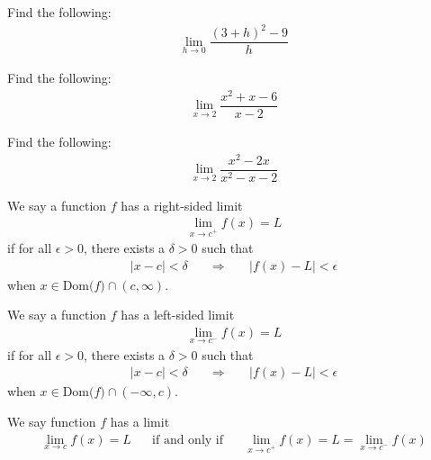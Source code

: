 \begin{exercise} Find the following:
\begin{align*}
    \lim_{h \longrightarrow 0} \dfrac{(3+h)^{2} - 9}{h}
\end{align*}
\end{exercise}

\begin{exercise}
Find the following:
\begin{align*}
    \lim_{x \longrightarrow 2} \dfrac{x^{2}+x-6}{x-2}
\end{align*}
\end{exercise}

\begin{exercise}
Find the following:
\begin{align*}
    \lim_{x \longrightarrow 2} \dfrac{x^{2}-2x}{x^{2}-x-2}
\end{align*}
\end{exercise}

\begin{definition}
We say a function $f$ has a right-sided limit
\begin{align*}
    \lim_{x \longrightarrow c^{+}} f(x) = L
\end{align*}
if for all $\epsilon > 0$, there exists a $\delta > 0$ such that
\begin{align*}
    \lvert x - c \rvert < \delta \hspace{20pt} \Longrightarrow \hspace{20pt} \lvert f(x) - L \rvert < \epsilon
\end{align*}
when $x \in \text{Dom($f$)} \cap (c, \infty)$.
\end{definition}

\begin{definition}
We say a function $f$ has a left-sided limit
\begin{align*}
    \lim_{x \longrightarrow c^{-}} f(x) = L
\end{align*}
if for all $\epsilon > 0$, there exists a $\delta > 0$ such that
\begin{align*}
    \lvert x - c \rvert < \delta \hspace{20pt} \Longrightarrow \hspace{20pt} \lvert f(x) - L \rvert < \epsilon
\end{align*}
when $x \in \text{Dom($f$)} \cap (-\infty, c)$.
\end{definition}

\begin{theorem}
We say function $f$ has a limit
\begin{align*}
    \lim_{x \longrightarrow c} f(x) = L \hspace{20pt} \text{if and only if} \hspace{20pt} \lim_{x \longrightarrow c^{+}} f(x) = L = \lim_{x \longrightarrow c^{-}} f(x)
\end{align*}
\end{theorem}

